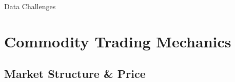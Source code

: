 \documentclass[10pt]{article}
\begin{document}
  \begin{core}{Data Challenges}


  \end{core}

\section{Commodity Trading Mechanics}

  \subsection{Market Structure \& Price}
\end{document}
